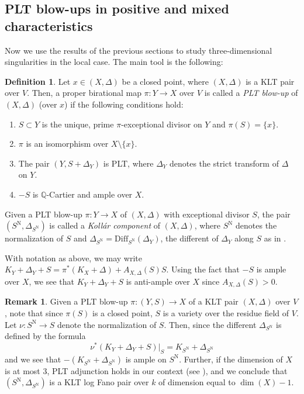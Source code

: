 \documentclass[11pt,reqno]{amsart}
\newcommand{\Q}{\mathbb{Q}}
\numberwithin{equation}{section}
\theoremstyle{definition}
\newtheorem{rem}[prop] {Remark}
\newtheorem{defi}[prop] {Definition}
\begin{document}
\subsection{PLT blow-ups in positive and mixed characteristics}

Now we use the results of the previous sections to study three-dimensional singularities in the local case. The main tool is the following:

\begin{defi} \label{defi:pltblowupinmixedchar}
       Let $x \in (X, \Delta)$ be a closed point, where $(X, \Delta)$ is a KLT pair over $V$. Then, a proper birational map $\pi: Y \to X$ over $V$ is called a \emph{PLT blow-up} of $(X, \Delta)$ (over $x$) if the following conditions hold:
    \begin{enumerate}
        \item $S \subset Y$ is the unique, prime $\pi$-exceptional divisor on $Y$ and $\pi(S) = \{x\}$. 
        \item $\pi$ is an isomorphism over $X \setminus \{x\}$.
        \item The pair $(Y, S + \Delta_Y)$ is PLT, where $\Delta_Y$ denotes the strict transform of $\Delta$ on $Y$.
        \item $-S$ is $\Q$-Cartier and ample over $X$.
    \end{enumerate}

    Given a PLT blow-up $\pi : Y \to X$ of $(X, \Delta)$ with exceptional divisor $S$, the pair $(S^{\text{N}}, \Delta_{S^{\text{N}}})$ is called a \emph{Koll\'ar component} of $(X, \Delta)$, where $S^{\text{N}}$ denotes the normalization of $S$ and $\Delta_{S^{\text{N}}} = \text{Diff}_{S^{\text{N}}} (\Delta_Y)$, the different of $\Delta_Y$ along $S$ as in \cite[Definition~4.2]{KollarKovacsSingularitiesBook}.
\end{defi}

With notation as above, we may write $K_Y + \Delta_Y + S = \pi^* (K_X + \Delta) + A_{X, \Delta} (S) S$. Using the fact that $-S$ is ample over $X$, we see that $K_Y + \Delta_ Y + S$ is anti-ample over $X$ since $A_{X, \Delta}(S) >0$.


\begin{rem}
    Given a PLT blow-up $\pi: (Y, S) \to X$ of a KLT pair $(X, \Delta)$ over $V$, note that since $\pi (S) $ is a closed point, $S$ is a variety over the residue field of $V$. Let $\nu: S^{\text{N}} \to S$ denote the normalization of $S$. Then, since the different $\Delta_{S^\text{N}} $ is defined by the formula
    \[ \nu^* (K_Y + \Delta_Y + S)|_S = K_{S^\text{N}} + \Delta_{S^\text{N}} \]
    and we see that $-(K_{S^\text{N}} + \Delta_{S^\text{N}} )$ is ample on $S^{\text{N}}$. Further, if the dimension of $X$ is at most $3$, PLT adjunction holds in our context (see \cite[Corollary 4.9]{HaconWitaszekRelativeMMPfor4folds}), and we conclude that $(S^\text{N}, \Delta_{S^\text{N}}) $ is a KLT log Fano pair over $k$ of dimension equal to $\dim(X) -1$. 
\end{rem}
\end{document}

